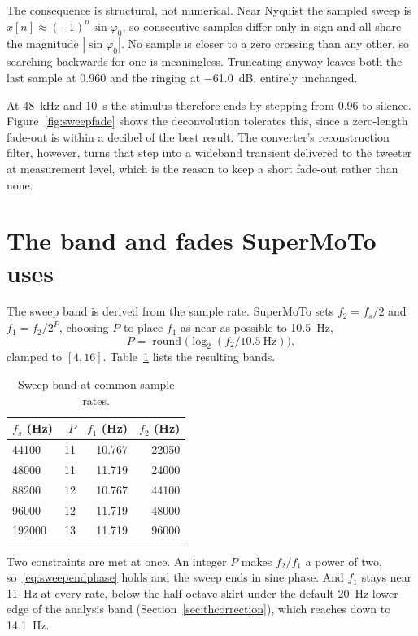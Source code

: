 The consequence is structural, not numerical. Near Nyquist the sampled sweep is $x[n] \approx (-1)^n \sin\varphi_0$, so consecutive samples differ only in sign and all share the magnitude $|\sin\varphi_0|$. No sample is closer to a zero crossing than any other, so searching backwards for one is meaningless. Truncating anyway leaves both the last sample at \num{0.960} and the ringing at \SI{-61.0}{\dB}, entirely unchanged.

At \SI{48}{\kilo\hertz} and \SI{10}{\second} the stimulus therefore ends by stepping from \num{0.96} to silence. Figure~\ref{fig:sweepfade} shows the deconvolution tolerates this, since a zero-length fade-out is within a decibel of the best result. The converter's reconstruction filter, however, turns that step into a wideband transient delivered to the tweeter at measurement level, which is the reason to keep a short fade-out rather than none.

\section{The band and fades SuperMoTo uses}
The sweep band is derived from the sample rate. SuperMoTo sets $f_2 = f_s/2$ and $f_1 = f_2/2^P$, choosing $P$ to place $f_1$ as near as possible to \SI{10.5}{\hertz},
\begin{equation}
  P = \operatorname{round}\bigl( \log_2 (f_2 / \SI{10.5}{\hertz}) \bigr),
\end{equation}
clamped to $[4, 16]$. Table~\ref{tab:sweepbands} lists the resulting bands.

\begin{table}[ht]
\centering
\caption{Sweep band at common sample rates.}
\label{tab:sweepbands}
\begin{tabular}{lrrr}
\toprule
$f_s$ (Hz) & $P$ & $f_1$ (Hz) & $f_2$ (Hz) \\
\midrule
\num{44100}  & 11 & 10.767 & 22050 \\
\num{48000}  & 11 & 11.719 & 24000 \\
\num{88200}  & 12 & 10.767 & 44100 \\
\num{96000}  & 12 & 11.719 & 48000 \\
\num{192000} & 13 & 11.719 & 96000 \\
\bottomrule
\end{tabular}
\end{table}

Two constraints are met at once. An integer $P$ makes $f_2/f_1$ a power of two, so~\eqref{eq:sweependphase} holds and the sweep ends in sine phase. And $f_1$ stays near \SI{11}{\hertz} at every rate, below the half-octave skirt under the default \SI{20}{\hertz} lower edge of the analysis band (Section~\ref{sec:thcorrection}), which reaches down to \SI{14.1}{\hertz}.

